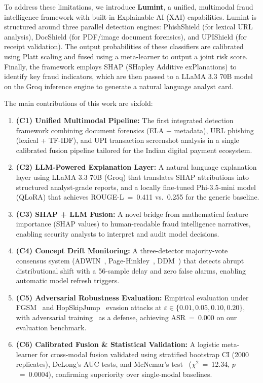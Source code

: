 \documentclass[journal]{IEEEtran}
\begin{document}
To address these limitations, we introduce \textbf{Lumint}, a unified, multimodal fraud intelligence framework with built-in Explainable AI (XAI) capabilities. Lumint is structured around three parallel detection engines: PhishShield (for lexical URL analysis), DocShield (for PDF/image document forensics), and UPIShield (for receipt validation). The output probabilities of these classifiers are calibrated using Platt scaling and fused using a meta-learner to output a joint risk score. Finally, the framework employs SHAP (SHapley Additive exPlanations) to identify key fraud indicators, which are then passed to a LLaMA 3.3 70B model on the Groq inference engine to generate a natural language analyst card.

The main contributions of this work are sixfold:
\begin{enumerate}
    \item \textbf{(C1) Unified Multimodal Pipeline:} The first integrated detection framework combining document forensics (ELA + metadata), URL phishing (lexical + TF-IDF), and UPI transaction screenshot analysis in a single calibrated fusion pipeline tailored for the Indian digital payment ecosystem.
    \item \textbf{(C2) LLM-Powered Explanation Layer:} A natural language explanation layer using LLaMA 3.3 70B (Groq) that translates SHAP attributions into structured analyst-grade reports, and a locally fine-tuned Phi-3.5-mini model (QLoRA) that achieves ROUGE-L~=~0.411 vs.~0.255 for the generic baseline.
    \item \textbf{(C3) SHAP + LLM Fusion:} A novel bridge from mathematical feature importance (SHAP values) to human-readable fraud intelligence narratives, enabling security analysts to interpret and audit model decisions.
    \item \textbf{(C4) Concept Drift Monitoring:} A three-detector majority-vote consensus system (ADWIN~\cite{adwin, adwin2007}, Page-Hinkley~\cite{page_hinkley}, DDM~\cite{ddm}) that detects abrupt distributional shift with a 56-sample delay and zero false alarms, enabling automatic model refresh triggers.
    \item \textbf{(C5) Adversarial Robustness Evaluation:} Empirical evaluation under FGSM~\cite{fgsm} and HopSkipJump~\cite{hopskipjump} evasion attacks at $\varepsilon \in \{0.01, 0.05, 0.10, 0.20\}$, with adversarial training~\cite{adv_training_madry} as a defense, achieving ASR~=~0.000 on our evaluation benchmark.
    \item \textbf{(C6) Calibrated Fusion \& Statistical Validation:} A logistic meta-learner for cross-modal fusion validated using stratified bootstrap CI (2000 replicates), DeLong's AUC tests, and McNemar's test~\cite{mcnemar1947} ($\chi^2$~=~12.34, $p$~=~0.0004), confirming superiority over single-modal baselines.
\end{enumerate}
\end{document}
